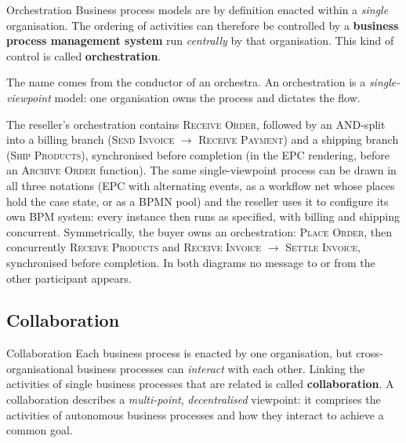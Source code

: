 \begin{definitionbox}{Orchestration}
Business process models are by definition enacted within a \emph{single} organisation. The ordering of activities can therefore be controlled by a \textbf{business process management system} run \emph{centrally} by that organisation. This kind of control is called \textbf{orchestration}.
\end{definitionbox}

The name comes from the conductor of an orchestra. An orchestration is a \emph{single-viewpoint} model: one organisation owns the process and dictates the flow.

The reseller's orchestration contains \textsc{Receive Order}, followed by an AND-split into a billing branch (\textsc{Send Invoice} $\to$ \textsc{Receive Payment}) and a shipping branch (\textsc{Ship Products}), synchronised before completion (in the EPC rendering, before an \textsc{Archive Order} function). The same single-viewpoint process can be drawn in all three notations (EPC with alternating events, as a workflow net whose places hold the case state, or as a BPMN pool) and the reseller uses it to configure its own BPM system: every instance then runs as specified, with billing and shipping concurrent. Symmetrically, the buyer owns an orchestration: \textsc{Place Order}, then concurrently \textsc{Receive Products} and \textsc{Receive Invoice} $\to$ \textsc{Settle Invoice}, synchronised before completion. In both diagrams no message to or from the other participant appears.

\subsection{Collaboration}

\begin{definitionbox}{Collaboration}
Each business process is enacted by one organisation, but cross-organisational business processes can \emph{interact} with each other. Linking the activities of single business processes that are related is called \textbf{collaboration}. A collaboration describes a \emph{multi-point}, \emph{decentralised} viewpoint: it comprises the activities of autonomous business processes and how they interact to achieve a common goal.
\end{definitionbox}

